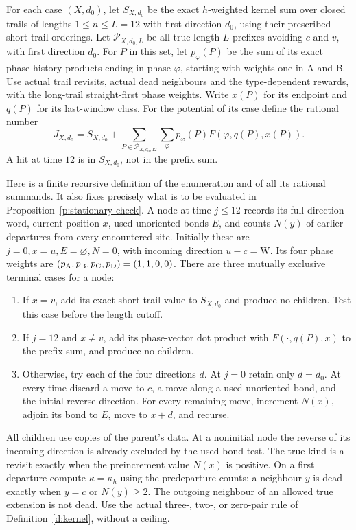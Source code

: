 \begin{definition}\label{d:prefix-bound}
For each case \((X,d_0)\), let \(S_{X,d_0}\) be the exact
\(h\)-weighted kernel sum over closed trails of lengths \(1\le n\le L=12\)
with first direction \(d_0\), using their prescribed short-trail orderings.
Let \(\mathcal P_{X,d_0,L}\) be all true length-\(L\) prefixes
avoiding \(c\) and \(v\), with first direction \(d_0\).
For \(P\) in this set, let \(p_\varphi(P)\) be the sum of its
exact phase-history products ending in phase \(\varphi\), starting
with weights one in A and B. Use actual trail revisits, actual dead
neighbours and the type-dependent rewards, with the long-trail
straight-first phase weights.
Write \(x(P)\) for its endpoint and \(q(P)\) for its last-window class.
For the potential of its case define the rational number
\[
 J_{X,d_0}=S_{X,d_0}
       +\sum_{P\in\mathcal P_{X,d_0,12}}\sum_\varphi
                    p_\varphi(P)F(\varphi,q(P),x(P)).
\]
A hit at time \(12\) is in \(S_{X,d_0}\), not in the prefix sum.
\end{definition}

Here is a finite recursive definition of the enumeration and of all
its rational summands. It also fixes precisely what is to be
evaluated in Proposition~\ref{p:stationary-check}. A node at time
\(j\le12\) records its full direction word, current position \(x\),
used unoriented bonds \(E\), and counts \(N(y)\) of earlier
departures from every encountered site. Initially these are
\(j=0,x=u,E=\varnothing,N=0\), with incoming direction
\(u-c=\mathrm W\). Its four phase weights are
\((p_{\rm A},p_{\rm B},p_{\rm C},p_{\rm D})=(1,1,0,0)\).
There are three mutually exclusive terminal cases for a node:
\begin{enumerate}
\item If \(x=v\), add its exact short-trail value to \(S_{X,d_0}\)
and produce no children. Test this case before the length cutoff.
\item If \(j=12\) and \(x\ne v\), add its phase-vector dot product
with \(F(\cdot,q(P),x)\) to the prefix sum, and produce no children.
\item Otherwise, try each of the four directions \(d\). At
\(j=0\) retain only \(d=d_0\). At every time discard a move to
\(c\), a move along a used unoriented bond, and the initial
reverse direction. For every remaining move, increment \(N(x)\),
adjoin its bond to \(E\), move to \(x+d\), and recurse.
\end{enumerate}
All children use copies of the parent's data. At a noninitial node
the reverse of its incoming direction is already excluded by the
used-bond test. The true kind is a revisit exactly when the
preincrement value \(N(x)\) is positive. On a first departure
compute \(\kappa=\kappa_h\) using the predeparture counts: a
neighbour \(y\) is dead exactly when \(y=c\) or \(N(y)\ge2\).
The outgoing neighbour of an allowed true extension is not dead.
Use the actual three-, two-, or zero-pair rule of
Definition~\ref{d:kernel}, without a ceiling.

